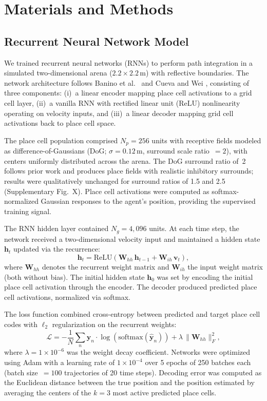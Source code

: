 \documentclass[11pt]{article}
\begin{document}
\section*{Materials and Methods}

\subsection*{Recurrent Neural Network Model}

We trained recurrent neural networks (RNNs) to perform path integration in a simulated two-dimensional arena ($2.2 \times 2.2$\,m) with reflective boundaries. The network architecture follows Banino et al.\ \cite{banino2018} and Cueva and Wei \cite{cueva2018}, consisting of three components: (i)~a linear encoder mapping place cell activations to a grid cell layer, (ii)~a vanilla RNN with rectified linear unit (ReLU) nonlinearity operating on velocity inputs, and (iii)~a linear decoder mapping grid cell activations back to place cell space.

The place cell population comprised $N_p = 256$ units with receptive fields modeled as difference-of-Gaussians (DoG; $\sigma = 0.12$\,m, surround scale ratio~$= 2$), with centers uniformly distributed across the arena. The DoG surround ratio of~2 follows prior work \cite{banino2018,cueva2018} and produces place fields with realistic inhibitory surrounds; results were qualitatively unchanged for surround ratios of 1.5 and 2.5 (Supplementary Fig.~X). Place cell activations were computed as softmax-normalized Gaussian responses to the agent's position, providing the supervised training signal.

The RNN hidden layer contained $N_g = 4{,}096$ units. At each time step, the network received a two-dimensional velocity input and maintained a hidden state $\mathbf{h}_t$ updated via the recurrence:
\begin{equation}
    \mathbf{h}_t = \mathrm{ReLU}\!\left(\mathbf{W}_{hh}\,\mathbf{h}_{t-1} + \mathbf{W}_{ih}\,\mathbf{v}_t\right),
\end{equation}
where $\mathbf{W}_{hh}$ denotes the recurrent weight matrix and $\mathbf{W}_{ih}$ the input weight matrix (both without bias). The initial hidden state $\mathbf{h}_0$ was set by encoding the initial place cell activation through the encoder. The decoder produced predicted place cell activations, normalized via softmax.

The loss function combined cross-entropy between predicted and target place cell codes with $\ell_2$ regularization on the recurrent weights:
\begin{equation}
    \mathcal{L} = -\frac{1}{N}\sum_{n}\mathbf{y}_n \cdot \log\!\left(\mathrm{softmax}(\hat{\mathbf{y}}_n)\right) + \lambda\,\lVert\mathbf{W}_{hh}\rVert_F^2,
\end{equation}
where $\lambda = 1 \times 10^{-6}$ was the weight decay coefficient. Networks were optimized using Adam with a learning rate of $1 \times 10^{-4}$ over 5 epochs of 250 batches each (batch size~$= 100$ trajectories of 20 time steps). Decoding error was computed as the Euclidean distance between the true position and the position estimated by averaging the centers of the $k = 3$ most active predicted place cells.
\end{document}
